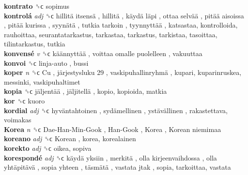 \textbf{kontrato} ␝ϲ  sopimus  \\
\textbf{kontrolá} \emph{adj}  ␝ϲ   hillitä itsensä ,  hillitä ,  käydä läpi ,  ottaa selvää ,  pitää aisoissa ,  pitää kurissa ,  syynätä ,  tutkia tarkoin ,  tyynnyttää , katsastaa, kontrolloida, rauhoittaa, seurantatarkastus, tarkastaa, tarkastus, tarkistaa, tasoittaa, tilintarkastus, tutkia  \\
\textbf{konvensé} \emph{v}  ␝ϲ   käännyttää ,  voittaa omalle puolelleen , vakuuttaa  \\
\textbf{konvoi} ␝ϲ   linja-auto , bussi  \\
\textbf{koper} \emph{n}  ␝ϲ   Cu ,  järjestysluku 29 ,  vaskipuhallinryhmä , kupari, kuparinruskea, messinki, vaskipuhaltimet  \\
\textbf{kopia} ␝ϲ   jäljentää ,  jäljitellä , kopio, kopioida, matkia  \\
\textbf{kor} ␝ϲ  kuoro  \\
\textbf{kordial} \emph{adj}  ␝ϲ   hyväntahtoinen ,  sydämellinen ,  ystävällinen , rakastettava, voimakas  \\
\textbf{Korea} \emph{n}  ␝ϲ   Dae-Han-Min-Gook ,  Han-Gook ,  Korea ,  Korean niemimaa   \\
\textbf{koreano} \emph{adj}  ␝ϲ   Korean , korea, korealainen  \\
\textbf{korekto} \emph{adj}  ␝ϲ  oikea, sopiva  \\
\textbf{korespondé} \emph{adj}  ␝ϲ   käydä yksiin ,  merkitä ,  olla kirjeenvaihdossa ,  olla yhtäpitävä ,  sopia yhteen ,  täsmätä ,  vastata jtak , sopia, tarkoittaa, vastata  \\

